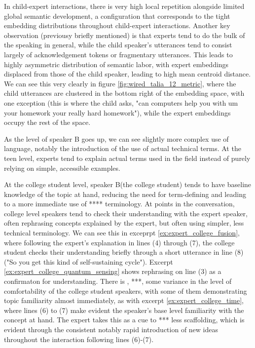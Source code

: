 \documentclass{article}
\theoremstyle{definition}
\numberwithin{table}{section}
\begin{document}
In child-expert interactions, there is very high local repetition alongside limited global semantic development, a configuration that corresponds to the tight embedding distributions throughout child-expert interactions. 
Another key observation (previousy briefly mentioned) is that experts tend to do the bulk of the speaking in general, while the child speaker's utterances tend to consist largely of acknowledgement tokens or fragmentary utterances. This leads to highly asymmetric distribution of semantic labor, with expert embeddings displaced from those of the child speaker, leading to high mean centroid distance. We can see this very clearly in figure \ref{fig:wired_talia_12_metric}, where the child utterances are clustered in the bottom right of the embedding space, with one exception (this is where the child asks, "can computers help you with um your homework your really hard homework"), while the expert embeddings occupy the rest of the space. 

As the level of speaker B goes up, we can see slightly more complex use of language, notably the introduction of the use of actual technical terms. At the teen level, experts tend to explain actual terms used in the field instead of purely relying on simple, accessible examples. 


At the college student level, speaker B(the college student) tends to have baseline knowledge of the topic at hand, reducing the need for term-defining and leading to a more immediate use of **** terminology. At points in the conversation, college level speakers tend to check their understanding with the expert speaker, often rephrasing concepts explained by the expert, but often using simpler, less technical terminology. We can see this in exceprpt \ref{ex:expert_college_fusion}, where following the expert's explanation in lines (4) through (7), the college student checks their understanding briefly through a short utterance in line (8) ("So you get this kind of self-sustaining cycle"). Excerpt \ref{ex:expert_college_quantum_sensing} shows rephrasing on line (3) as a confirmaton for understanding. There is , ***, some variance in the level of comfortability of the college student speakers, with some of them demonstrating topic familiarity almost immediately, as with excerpt \ref{ex:expert_college_time}, where lines (6) to (7) make evident the speaker's base level familiarity with the concept at hand. The expert takes this as a cue to *** less scaffolding, which is evident through the consistent notably rapid introduction of new ideas throughout the interaction following lines (6)-(7).  
\end{document}
